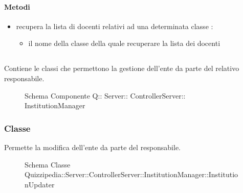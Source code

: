 \paragraph{Metodi}
\begin{itemize}
\item {}
\newline
recupera la lista di docenti relativi ad una determinata classe
\newline
{} :
\begin{itemize}
\item {}
\newline
il nome della classe della quale recuperare la lista dei docenti
\end{itemize}
\end{itemize}
\subsection{}
Contiene le classi che permettono la gestione dell'ente da parte del relativo responsabile.
\begin{figure}[H]
\centering
\noindent{}
\caption[Schema Componente Quizzipedia::Server::ControllerServer::InstitutionManager]{Schema Componente Q:: Server:: ControllerServer:: InstitutionManager}
\end{figure}
\subsubsection{Classe }
Permette la modifica dell'ente da parte del responsabile.
\begin{figure}[H]
\centering
\noindent{}
\caption[Schema Classe InstitutionUpdater]{Schema Classe Quizzipedia::Server::ControllerServer::InstitutionManager::InstitutionUpdater}
\end{figure}
